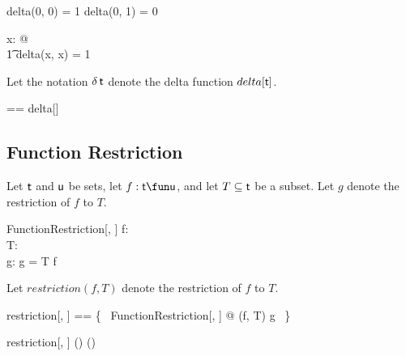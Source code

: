 \documentclass{amsart}
\begin{document}
\begin{example}
\begin{zed}
	delta(0, 0) = 1
\also
	delta(0, 1) = 0
\end{zed}
\end{example}

\begin{remark}
\begin{zed}
	\forall x: \setX @ \\
	\t1	delta(x, x) = 1
\end{zed}
\end{remark}

Let the notation $\operatorname{\delta} \mathsf{t}$ denote the delta function $delta[\mathsf{t}]$.

\begin{zed}
	\deltaF \genT == delta[\genT]
\end{zed}

\begin{example}
\end{example}

\subsection{Function Restriction}

Let $\mathsf{t}$ and $\mathsf{u}$ be sets, let $f: \genT \fun \genU$, and let $T \subseteq \mathsf{t}$ be a subset.
Let $g$ denote the restriction of $f$ to $T$.

\begin{schema}{FunctionRestriction}[\genT, \genU]
	f: \genT \fun \genU \\
	T: \power \genT \\
	g: \genT \pfun \genU
\where
	g = T \dres f
\end{schema}

Let  $restriction(f, T)$ denote the restriction of $f$ to $T$.

\begin{zed}
	restriction[\genT, \genU] == \{~ FunctionRestriction[\genT, \genU] @ (f, T) \mapsto g ~\}
\end{zed}

\begin{remark}
\begin{zed}
	restriction[\setT, \setU] \in (\setT \fun \setU) \cross \power \setT \fun (\setT \pfun \setU)
\end{zed}
\end{remark}
\end{document}
